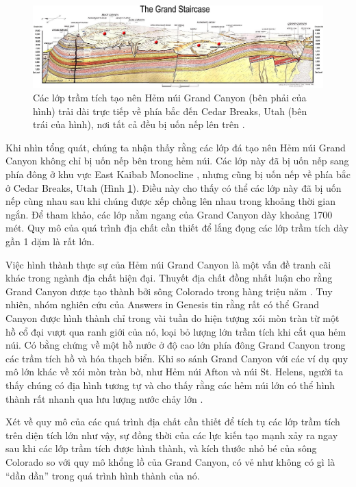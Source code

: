 \documentclass[10pt,twocolumn,letterpaper]{article}
\begin{document}
\begin{figure}
\begin{center}
\includegraphics[width=1\textwidth]{Grand_Staircase-big.jpg}
\end{center}
   \caption{Các lớp trầm tích tạo nên Hẻm núi Grand Canyon (bên phải của hình) trải dài trực tiếp về phía bắc đến Cedar Breaks, Utah (bên trái của hình), nơi tất cả đều bị uốn nếp lên trên \cite{50}.}
\label{fig:4}
\end{figure}

Khi nhìn tổng quát, chúng ta nhận thấy rằng các lớp đá tạo nên Hẻm núi Grand Canyon không chỉ bị uốn nếp bên trong hẻm núi. Các lớp này đã bị uốn nếp sang phía đông ở khu vực East Kaibab Monocline \cite{46}, nhưng cũng bị uốn nếp về phía bắc ở Cedar Breaks, Utah (Hình \ref{fig:4}). Điều này cho thấy có thể các lớp này đã bị uốn nếp cùng nhau sau khi chúng được xếp chồng lên nhau trong khoảng thời gian ngắn. Để tham khảo, các lớp nằm ngang của Grand Canyon dày khoảng 1700 mét. Quy mô của quá trình địa chất cần thiết để lắng đọng các lớp trầm tích dày gần 1 dặm là rất lớn.

Việc hình thành thực sự của Hẻm núi Grand Canyon là một vấn đề tranh cãi khác trong ngành địa chất hiện đại. Thuyết địa chất đồng nhất luận cho rằng Grand Canyon được tạo thành bởi sông Colorado trong hàng triệu năm \cite{47}. Tuy nhiên, nhóm nghiên cứu của Answers in Genesis tin rằng rất có thể Grand Canyon được hình thành chỉ trong vài tuần do hiện tượng xói mòn tràn từ một hồ cổ đại vượt qua ranh giới của nó, loại bỏ lượng lớn trầm tích khi cắt qua hẻm núi. Có bằng chứng về một hồ nước ở độ cao lớn phía đông Grand Canyon trong các trầm tích hồ và hóa thạch biển. Khi so sánh Grand Canyon với các ví dụ quy mô lớn khác về xói mòn tràn bờ, như Hẻm núi Afton và núi St. Helens, người ta thấy chúng có địa hình tương tự và cho thấy rằng các hẻm núi lớn có thể hình thành rất nhanh qua lưu lượng nước chảy lớn \cite{48}.

Xét về quy mô của các quá trình địa chất cần thiết để tích tụ các lớp trầm tích trên diện tích lớn như vậy, sự đồng thời của các lực kiến tạo mạnh xảy ra ngay sau khi các lớp trầm tích được hình thành, và kích thước nhỏ bé của sông Colorado so với quy mô khổng lồ của Grand Canyon, có vẻ như không có gì là “dần dần” trong quá trình hình thành của nó.
\end{document}
